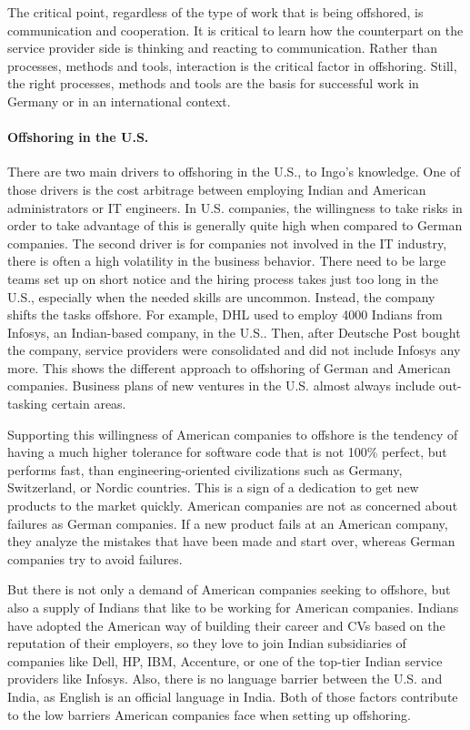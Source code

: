 The critical point, regardless of the type of work that is being offshored, is communication and cooperation. It is critical to learn how the counterpart on the service provider side is thinking and reacting to communication. Rather than processes, methods and tools, interaction is the critical factor in offshoring. Still, the right processes, methods and tools are the basis for successful work in Germany or in an international context.

\paragraph{Offshoring in the U.S.}
There are two main drivers to offshoring in the U.S., to Ingo's knowledge. One of those drivers is the cost arbitrage between employing Indian and American administrators or IT engineers. In U.S. companies, the willingness to take risks in order to take advantage of this is generally quite high when compared to German companies. The second driver is for companies not involved in the IT industry, there is often a high volatility in the business behavior. There need to be large teams set up on short notice and the hiring process takes just too long in the U.S., especially when the needed skills are uncommon. Instead, the company shifts the tasks offshore. For example, DHL used to employ 4000 Indians from Infosys, an Indian-based company, in the U.S.. Then, after Deutsche Post bought the company, service providers were consolidated and did not include Infosys any more. This shows the different approach to offshoring of German and American companies. Business plans of new ventures in the U.S. almost always include out-tasking certain areas.

Supporting this willingness of American companies to offshore is the tendency of having a much higher tolerance for software code that is not 100\% perfect, but performs fast, than engineering-oriented civilizations such as Germany, Switzerland, or Nordic countries. This is a sign of a dedication to get new products to the market quickly. American companies are not as concerned about failures as German companies. If a new product fails at an American company, they analyze the mistakes that have been made and start over, whereas German companies try to avoid failures.

But there is not only a demand of American companies seeking to offshore, but also a supply of Indians that like to be working for American companies. Indians have adopted the American way of building their career and CVs based on the reputation of their employers, so they love to join Indian subsidiaries of companies like Dell, HP, IBM, Accenture, or one of the top-tier Indian service providers like Infosys. Also, there is no language barrier between the U.S. and India,  as English is an official language in India. Both of those factors contribute to the low barriers American companies face when setting up offshoring.

